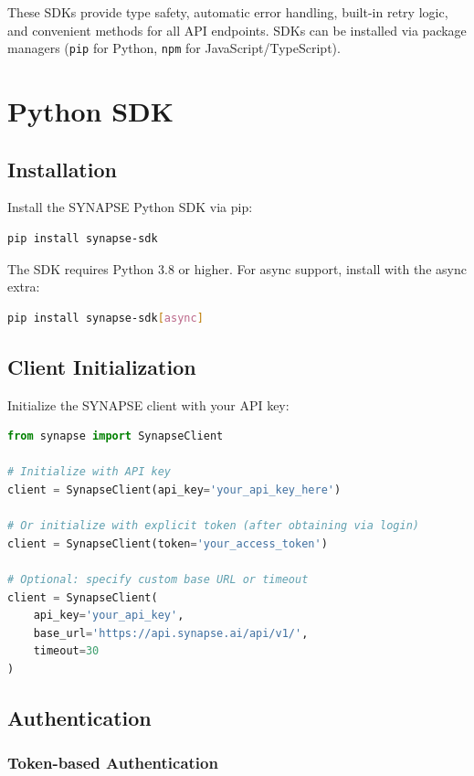 \documentclass{report}
\begin{document}
These SDKs provide type safety, automatic error handling, built-in retry logic, and convenient methods for all API endpoints. SDKs can be installed via package managers (\texttt{pip} for Python, \texttt{npm} for JavaScript/TypeScript).

\chapter{Python SDK}

\section{Installation}

Install the SYNAPSE Python SDK via pip:

\begin{lstlisting}[language=bash]
pip install synapse-sdk
\end{lstlisting}

The SDK requires Python 3.8 or higher. For async support, install with the async extra:

\begin{lstlisting}[language=bash]
pip install synapse-sdk[async]
\end{lstlisting}

\section{Client Initialization}

Initialize the SYNAPSE client with your API key:

\begin{lstlisting}[language=Python]
from synapse import SynapseClient

# Initialize with API key
client = SynapseClient(api_key='your_api_key_here')

# Or initialize with explicit token (after obtaining via login)
client = SynapseClient(token='your_access_token')

# Optional: specify custom base URL or timeout
client = SynapseClient(
    api_key='your_api_key',
    base_url='https://api.synapse.ai/api/v1/',
    timeout=30
)
\end{lstlisting}

\section{Authentication}

\subsection{Token-based Authentication}
\end{document}
